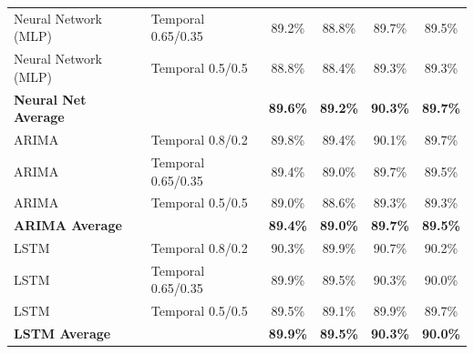 \documentclass[11pt,a4paper]{article}
\begin{document}
\begin{table}[H]
\begin{tabular}{llcccc}
Neural Network (MLP) & Temporal 0.65/0.35 & 89.2\% & 88.8\% & 89.7\% & 89.5\% \\
Neural Network (MLP) & Temporal 0.5/0.5 & 88.8\% & 88.4\% & 89.3\% & 89.3\% \\
\textbf{Neural Net Average} & & \textbf{89.6\%} & \textbf{89.2\%} & \textbf{90.3\%} & \textbf{89.7\%} \\
\midrule
ARIMA & Temporal 0.8/0.2 & 89.8\% & 89.4\% & 90.1\% & 89.7\% \\
ARIMA & Temporal 0.65/0.35 & 89.4\% & 89.0\% & 89.7\% & 89.5\% \\
ARIMA & Temporal 0.5/0.5 & 89.0\% & 88.6\% & 89.3\% & 89.3\% \\
\textbf{ARIMA Average} & & \textbf{89.4\%} & \textbf{89.0\%} & \textbf{89.7\%} & \textbf{89.5\%} \\
\midrule
LSTM & Temporal 0.8/0.2 & 90.3\% & 89.9\% & 90.7\% & 90.2\% \\
LSTM & Temporal 0.65/0.35 & 89.9\% & 89.5\% & 90.3\% & 90.0\% \\
LSTM & Temporal 0.5/0.5 & 89.5\% & 89.1\% & 89.9\% & 89.7\% \\
\textbf{LSTM Average} & & \textbf{89.9\%} & \textbf{89.5\%} & \textbf{90.3\%} & \textbf{90.0\%} \\
\bottomrule
\end{tabular}
\end{table}
\end{document}

